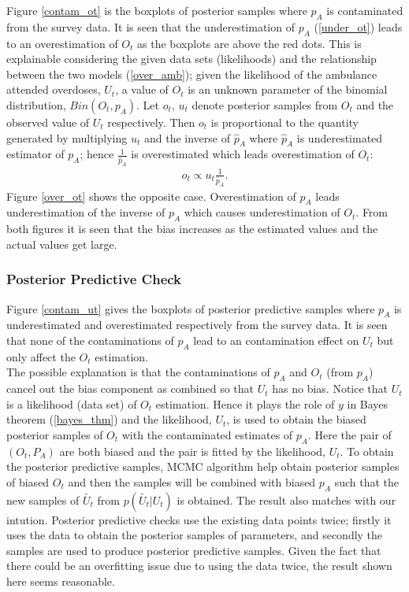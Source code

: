 \documentclass[12pt]{article}
\begin{document}
{\normalsize 
Figure \ref{contam_ot} is the boxplots of posterior samples where $p_A$ is contaminated from the survey data. It is seen that the underestimation of $p_A$ (\ref{under_ot}) leads to an overestimation of $O_t$ as the boxplots are above the red dots. This is explainable considering the given data sets (likelihoods) and the relationship between the two models (\ref{over_amb}); given the likelihood of the ambulance attended overdoses, $U_t$, a value of $O_t$ is an unknown parameter of the binomial distribution, $Bin(O_t, p_A)$. Let $o_t$, $u_t$ denote posterior samples from $O_t$ and the observed value of $U_t$ respectively. Then $o_t$ is proportional to the quantity generated by multiplying $u_t$ and the inverse of $\hat{p}_{A}$ where $\hat{p}_{A}$ is underestimated estimator of $p_A$; hence $\frac{1}{\hat{p}_{A}}$ is overestimated which leads overestimation of $O_t$:
\begin{equation}
\label{ot.how.made}
\begin{aligned}
o_t \propto u_t \frac{1}{\hat{p}_{A}}.
\end{aligned}
\end{equation}
Figure \ref{over_ot} shows the opposite case. Overestimation of $p_A$ leads underestimation of the inverse of $p_A$ which causes underestimation of $O_t$. From both figures it is seen that the bias increases as the estimated values and the actual values get large.\\

\subsubsection{Posterior Predictive Check}

Figure \ref{contam_ut} gives the boxplots of posterior predictive samples where $p_A$ is underestimated and overestimated respectively from the survey data. It is seen that none of the contaminations of $p_A$ lead to an contamination effect on $U_t$ but only affect the $O_t$ estimation.\\

The possible explanation is that the contaminations of  $p_A$ and $O_t$ (from $p_A$) cancel out the bias component as combined so that $U_t$ has no bias. Notice that $U_t$ is a likelihood (data set) of $O_t$ estimation. Hence it plays the role of $y$ in Bayes theorem (\ref{bayes_thm}) and the likelihood, $U_t$, is used to obtain the biased posterior samples of $O_t$ with the contaminated estimates of $p_A$. Here the pair of $(O_t, P_A)$ are both biased and the pair is fitted by the likelihood, $U_t$. To obtain the posterior predictive samples, MCMC algorithm help obtain posterior samples of biased $O_t$ and then the samples will be combined with biased $p_A$ such that the new samples of $\tilde{U_t}$ from $p(\tilde{U_t}|{U_t})$ is obtained.  The result also matches with our intution. Posterior predictive checks use the existing data points twice; firstly it uses the data to obtain the posterior samples of parameters, and secondly the samples are used to produce posterior predictive samples. Given the fact that there could be an overfitting issue due to using the data twice, the result shown here seems reasonable. 
\\

}
\end{document}
